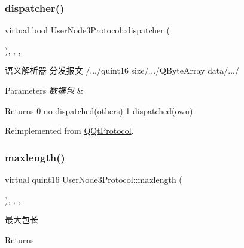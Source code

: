 \subsubsection{\texorpdfstring{dispatcher()}{dispatcher()}}
{\footnotesize\ttfamily virtual bool User\+Node3\+Protocol\+::dispatcher (\begin{DoxyParamCaption}\item[{const Q\+Byte\+Array \&}]{ }\end{DoxyParamCaption})\hspace{0.3cm}{\ttfamily [inline]}, {\ttfamily [override]}, {\ttfamily [protected]}, {\ttfamily [virtual]}}



语义解析器 分发报文 /.../quint16 size/.../\+Q\+Byte\+Array data/.../ 


\begin{DoxyParams}{Parameters}
{\em 数据包} & \\
\hline
\end{DoxyParams}
\begin{DoxyReturn}{Returns}
0 no dispatched(others) 1 dispatched(own) 
\end{DoxyReturn}


Reimplemented from \mbox{\hyperlink{class_q_qt_protocol_a35a69c4b89c8cf7459038f40d75e0dc9}{Q\+Qt\+Protocol}}.

\mbox{\label{class_user_node3_protocol_a44ee62880791a5b3d9d2fe40ad2b6c6f}} 
\subsubsection{\texorpdfstring{maxlength()}{maxlength()}}
{\footnotesize\ttfamily virtual quint16 User\+Node3\+Protocol\+::maxlength (\begin{DoxyParamCaption}{ }\end{DoxyParamCaption})\hspace{0.3cm}{\ttfamily [inline]}, {\ttfamily [override]}, {\ttfamily [protected]}, {\ttfamily [virtual]}}



最大包长 

\begin{DoxyReturn}{Returns}

\end{DoxyReturn}


